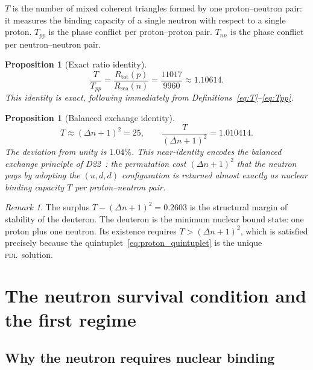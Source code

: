 \documentclass{article}
\newtheorem{proposition}[theorem]{Proposition}
\theoremstyle{remark}
\newtheorem{remark}[theorem]{Remark}
\newcommand{\PDL}{\textsc{pdl}}
\newcommand{\Rsea}{R_{\mathrm{sea}}}
\newcommand{\Rtot}{R_{\mathrm{tot}}}
\newcommand{\Tpp}{T_{pp}}
\newcommand{\Tnn}{T_{nn}}
\newcommand{\Deltanop}{\Delta n}
\begin{document}
$T$ is the number of mixed coherent triangles formed by one proton--neutron pair: it measures the binding capacity of a single neutron with respect to a single proton. $\Tpp$ is the phase conflict per proton--proton pair. $\Tnn$ is the phase conflict per neutron--neutron pair.

\begin{proposition}[Exact ratio identity]
\label{prop:ratio}
\begin{equation}
  \frac{T}{\Tpp} = \frac{\Rtot(p)}{\Rsea(n)} = \frac{11017}{9960} \approx 1.10614.
  \label{eq:ratio_identity}
\end{equation}
This identity is exact, following immediately from Definitions~\eqref{eq:T}--\eqref{eq:Tpp}.
\end{proposition}

\begin{proposition}[Balanced exchange identity]
\label{prop:balanced}
\begin{equation}
  T \approx (\Deltanop+1)^2 = 25, \qquad \frac{T}{(\Deltanop+1)^2} = 1.010414.
  \label{eq:balanced_exchange}
\end{equation}
The deviation from unity is $1.04\%$. This near-identity encodes the balanced exchange principle of D22~\cite{D22}: the permutation cost $(\Deltanop+1)^2$ that the neutron pays by adopting the $(u,d,d)$ configuration is returned almost exactly as nuclear binding capacity $T$ per proton--neutron pair.
\end{proposition}

\begin{remark}
The surplus $T - (\Deltanop+1)^2 = 0.2603$ is the structural margin of stability of the deuteron. The deuteron is the minimum nuclear bound state: one proton plus one neutron. Its existence requires $T > (\Deltanop+1)^2$, which is satisfied precisely because the quintuplet~\eqref{eq:proton_quintuplet} is the unique \PDL\ solution.
\end{remark}

\section{The neutron survival condition and the first regime}
\label{sec:survival}

\subsection{Why the neutron requires nuclear binding}
\end{document}
